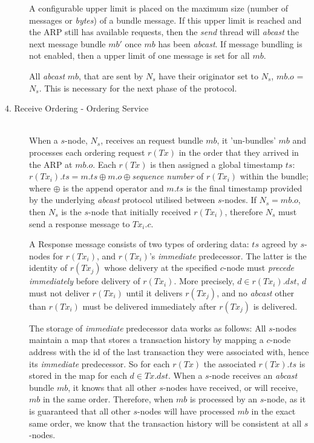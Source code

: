 \begin{description}
		A configurable upper limit is placed on the maximum size (number of messages or \emph{bytes}) of a bundle message.  If this upper limit is reached and the ARP still has available requests, then the \emph{send} thread will \emph{abcast} the next message bundle $mb'$ once $mb$ has been \emph{abcast}.  If message bundling is not enabled, then a upper limit of one message is set for all $mb$.  
		
		All \emph{abcast} $mb$, that are sent by $N_s$ have their originator set to $N_s$, $mb.o$ = $N_s$.  This is necessary for the next phase of the protocol.  
		
		\item[4. Receive Ordering - Ordering Service] \hfill \\
		When a $s$-node, $N_s$, receives an request bundle $mb$, it 'un-bundles' $mb$ and processes each ordering request $r(Tx)$ in the order that they arrived in the ARP at $mb.o$.  Each $r(Tx)$ is then assigned a global timestamp $ts$: $r(Tx_i).ts = m.ts\oplus m.o \oplus$\emph{sequence number} of $r(Tx_i)$ within the bundle; where $\oplus$ is the append operator and $m.ts$ is the final timestamp provided by the underlying \emph{abcast} protocol utilised between $s$-nodes.  If $N_s = mb.o$, then $N_s$ is the $s$-node that initially received $r(Tx_i)$, therefore $N_s$ must send a response message to $Tx_i.c$.    
		
		A Response message consists of two types of ordering data: $ts$ agreed by $s$-nodes for $r(Tx_i)$, and $r(Tx_i)$'s \emph{immediate} predecessor.  The latter is the identity of $r(Tx_j)$ whose delivery at the specified $c$-node must \emph{precede} \emph{immediately} before delivery of $r(Tx_i)$.  More precisely, $d \in r(Tx_i).dst$, $d$ must not deliver $r(Tx_i)$ until it delivers $r(Tx_j)$, and no \emph{abcast} other than $r(Tx_i)$ must be delivered immediately after $r(Tx_j)$ is delivered.
		
		The storage of \emph{immediate} predecessor data works as follows: All $s$-nodes maintain a map that stores a transaction history by mapping a $c$-node address with the id of the last transaction they were associated with, hence its \emph{immediate} predecessor.  So for each $r(Tx)$ the associated $r(Tx).ts$ is stored in the map for each $d \in Tx.dst$. When a $s$-node receives an \emph{abcast} bundle $mb$, it knows that all other $s$-nodes have received, or will receive, $mb$ in the same order.  Therefore, when $mb$ is processed by an $s$-node, as it is guaranteed that all other $s$-nodes will have processed $mb$ in the exact same order, we know that the transaction history will be consistent at all $s$-nodes.  
		

\end{description}
